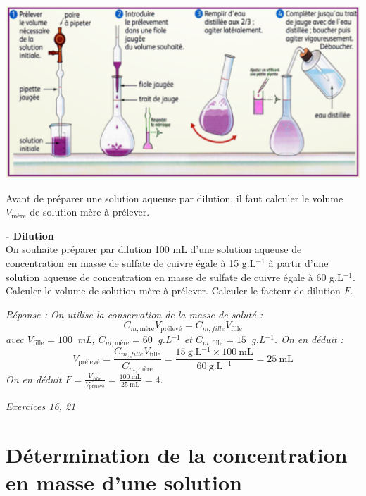 \begin{center}
    \includegraphics[scale=0.6]{Images/Protocole_dilution.png}
\end{center}

Avant de préparer une solution aqueuse par  dilution, il faut calculer le volume $V_{\text{mère}}$ de solution mère à 
prélever.\\

\begin{mdframed}[style=autreexo]
\textbf{ - Dilution}\\
On souhaite préparer par dilution 100 mL d’une solution aqueuse de concentration en masse de sulfate de cuivre égale à 15 g.L$^{-1}$ à partir d’une solution aqueuse de concentration en masse de sulfate de cuivre égale à 60 g.L$^{-1}$. Calculer le volume de solution mère à prélever. Calculer le facteur de dilution $F$.
\end{mdframed}
\textit{Réponse : On utilise la conservation de la masse de soluté : 
\begin{equation*}
    C_{m,\text{mère}}V_{\text{prélevé}} = C_{m,fille}V_{\text{fille}}
\end{equation*}
avec $V_{\text{fille}}=100$~mL, $C_{m,\text{mère}}=60$~g.L$^{-1}$ et $C_{m,\text{fille}}=15$~g.L$^{-1}$. On en déduit :
\begin{equation*}
    V_{\text{prélevé}}=\frac{C_{m,fille}V_{\text{fille}}}{C_{m,\text{mère}}}=\frac{15~\text{g.L$^{-1}$}\times100~\text{mL}}{60~\text{g.L$^{-1}$}}=25~\text{mL}
\end{equation*}
On en déduit $F=\frac{V_{fille}}{V_{\text{prélevé}}}=\frac{100~\text{mL}}{25~\text{mL}}=4$}.


\begin{Large}
\end{Large}\textit{Exercices 16, 21}
\section{Détermination de la concentration en masse d'une solution}

